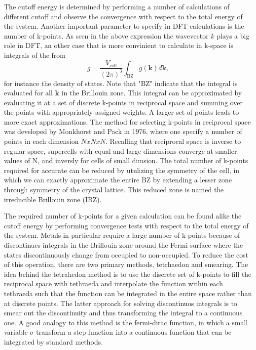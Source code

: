 The cutoff energy is determined by performing a number of calculations of different cutoff and observe the convergence with respect to the total energy of the system. Another important parameter to specify in DFT calculations is the number of k-points. As seen in the above expression the wavevector $k$ plays a big role in DFT, an other case that is more convinient to calculate in k-space is integrals of the from 
\begin{equation}
    g = \frac{V_{\text{cell}}}{(2\pi)^3} \int_{\text{BZ}} g(\boldsymbol{k})d\boldsymbol{k},
\end{equation}
for instance the density of states. Note that "BZ" indicate that the integral is evaluated for all $\boldsymbol{k}$ in the Brillouin zone. This integral can be approximated by evaluating it at a set of discrete k-points in reciprocal space and summing over the points with appropriately assigned weights. A larger set of points leads to more exact approximations. The method for selecting k-points in reciprocal space was developed by Monkhorst and Pack in 1976, where one specify a number of points in each dimension $N x N x N$. Recalling that reciprocal space is inverse to regular space, supercells with equal and large dimensions converge at smaller values of N, and inversly for cells of small dimsion. The total number of k-points required for accurate can be reduced by utulizing the symmetry of the cell, in which we can exactly approximate the entire BZ by extending a lesser zone through symmetry of the crystal lattice. This reduced zone is named the irreducible Brillouin zone (IBZ). 

The required number of k-points for a given calculation can be found alike the cutoff energy by performing convergence tests with respect to the total energy of the system. Metals in particular require a large number of k-points because of discontinues integrals in the Brillouin zone around the Fermi surface where the states discontinuously change from occupied to non-occupied. To reduce the cost of this operation, there are two primary methods, tetrhaedon and smearing. The idea behind the tetrahedon method is to use the discrete set of k-points to fill the reciprocal space with tethraeda and interpolate the function within each tethraeda such that the function can be integrated in the entire space rather than at discrete points. The latter approach for solving discontinuos integrals is to smear out the discontinuity and thus transforming the integral to a continuous one. A good analogy to this method is the fermi-dirac function, in which a small variable $\sigma$ transform a step-function into a continuous function that can be integrated by standard methods.

